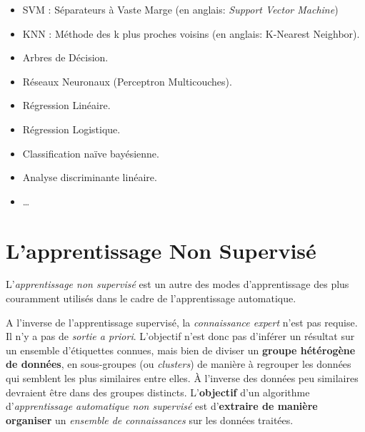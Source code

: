 \begin{itemize}
	\item SVM : Séparateurs à Vaste Marge (en anglais: \textit{Support Vector Machine})\\
	
	\item KNN : Méthode des k plus proches voisins (en anglais:  K-Nearest Neighbor).\\
	
	\item Arbres de Décision.\\
	
	\item Réseaux Neuronaux (Perceptron Multicouches).\\
	
	\item Régression Linéaire.\\
	
	\item Régression Logistique.\\
	
	\item Classification naïve bayésienne.\\
	
	\item Analyse discriminante linéaire.\\
	
	\item  \ldots
	
\end{itemize}
\clearpage	
	
\section{L'apprentissage Non Supervisé}

L'\textit{apprentissage non supervisé} est un autre des modes d'apprentissage des plus couramment utilisés dans le cadre de l'apprentissage automatique.

A l'inverse de l'apprentissage supervisé, la \textit{connaissance expert} n'est pas requise. Il n'y a pas de \textit{sortie a priori}. L'objectif n'est donc pas d'inférer un résultat sur un ensemble d'étiquettes connues, mais bien de diviser un \textbf{groupe hétérogène de données}, en sous-groupes (ou \textit{clusters}) de manière à regrouper les données qui semblent les plus similaires entre elles. À l'inverse des données peu similaires devraient être dans des groupes distincts. L'\textbf{objectif} d'un algorithme d'\textit{apprentissage automatique non supervisé} est d'\textbf{extraire de manière organiser} un \textit{ensemble de connaissances} sur les données traitées.


